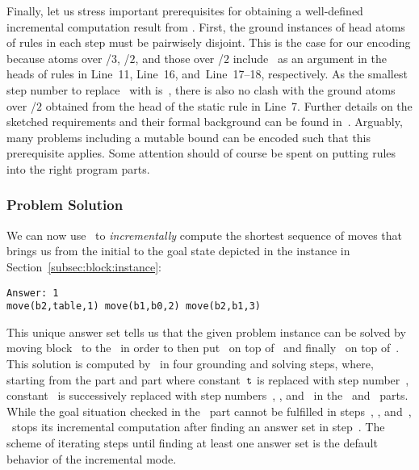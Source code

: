 Finally, let us stress important prerequisites for obtaining
a well-defined incremental computation result from \clingo.
First, the ground instances of head atoms of rules in each step must be pairwisely disjoint.
This is the case for our encoding because atoms over /$3$, /$2$,
and those over /$2$ include~ as an argument in the
heads of rules in Line~11, Line~16, and~Line~17--18, respectively.
As the smallest step number to replace~ with is~,
there is also no clash with the ground atoms over /$2$
obtained from the head of the static rule in Line~7.
Further details on the sketched requirements and their formal background can
be found in~\cite{gekakaosscth08a}.
Arguably, many problems including a mutable bound can be encoded
such that this prerequisite applies.
Some attention should of course be spent on putting rules into the right program parts.

\subsubsection{Problem Solution}\label{subsec:block:solution}

We can now use \clingo\ to \emph{incrementally} compute the shortest
sequence of moves that brings us from the initial to the goal state
depicted in the instance in Section~\ref{subsec:block:instance}:%
%
\begin{lstlisting}[numbers=none]
Answer: 1
move(b2,table,1) move(b1,b0,2) move(b2,b1,3)
\end{lstlisting}
%
This unique answer set tells us
that the given problem instance can be solved by moving block~ to the~
in order to then put~ on top of~ and finally~ on top of~.
This solution is computed by \clingo\ in four grounding and solving steps,
where, starting from the  part and  part where constant~$\texttt{t}$ is replaced with step number~, 
constant~ is successively replaced with step numbers~, , and~ in the~ and~ parts.
While the goal situation checked in the~ part cannot be fulfilled in steps~, , and~,
\clingo\ stops its incremental computation after finding an answer set in step~.
The scheme of iterating steps until finding at least one answer set is the default behavior of the incremental mode.

